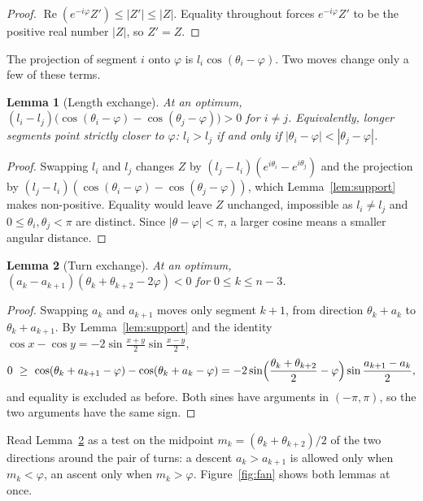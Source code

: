 \documentclass[11pt]{article}
\newtheorem{lemma}{Lemma}[section]
\theoremstyle{remark}
\begin{document}
\begin{proof}
$\operatorname{Re}(e^{-i\varphi}Z')\le|Z'|\le|Z|$. Equality throughout forces $e^{-i\varphi}Z'$ to be the positive real number $|Z|$, so $Z'=Z$.
\end{proof}

The projection of segment $i$ onto $\varphi$ is $l_i\cos(\theta_i-\varphi)$. Two moves change only a few of these terms.

\begin{lemma}[Length exchange]\label{lem:length}
At an optimum, $(l_i-l_j)\bigl(\cos(\theta_i-\varphi)-\cos(\theta_j-\varphi)\bigr)>0$ for $i\ne j$. Equivalently, longer segments point strictly closer to $\varphi$: $l_i>l_j$ if and only if $|\theta_i-\varphi|<|\theta_j-\varphi|$.
\end{lemma}

\begin{proof}
Swapping $l_i$ and $l_j$ changes $Z$ by $(l_j-l_i)(e^{i\theta_i}-e^{i\theta_j})$ and the projection by $(l_j-l_i)(\cos(\theta_i-\varphi)-\cos(\theta_j-\varphi))$, which Lemma~\ref{lem:support} makes non-positive. Equality would leave $Z$ unchanged, impossible as $l_i\neq l_j$ and $0\le\theta_i,\theta_j<\pi$ are distinct. Since $|\theta-\varphi|<\pi$, a larger cosine means a smaller angular distance.
\end{proof}

\begin{lemma}[Turn exchange]\label{lem:turn}
At an optimum, $(a_k-a_{k+1})(\theta_k+\theta_{k+2}-2\varphi)<0$ for $0\le k\le n-3$.
\end{lemma}

\begin{proof}
Swapping $a_k$ and $a_{k+1}$ moves only segment $k+1$, from direction $\theta_k+a_k$ to $\theta_k+a_{k+1}$. By Lemma~\ref{lem:support} and the identity $\cos x-\cos y=-2\sin\frac{x+y}2\sin\frac{x-y}2$,
\[
0\ \ge\ \cos(\theta_k+a_{k+1}-\varphi)-\cos(\theta_k+a_k-\varphi)
=-2\sin\Bigl(\frac{\theta_k+\theta_{k+2}}2-\varphi\Bigr)\sin\frac{a_{k+1}-a_k}2 ,
\]
and equality is excluded as before. Both sines have arguments in $(-\pi,\pi)$, so the two arguments have the same sign.
\end{proof}

Read Lemma~\ref{lem:turn} as a test on the midpoint $m_k=(\theta_k+\theta_{k+2})/2$ of the two directions around the pair of turns: a descent $a_k>a_{k+1}$ is allowed only when $m_k<\varphi$, an ascent only when $m_k>\varphi$. Figure~\ref{fig:fan} shows both lemmas at once.
\end{document}
